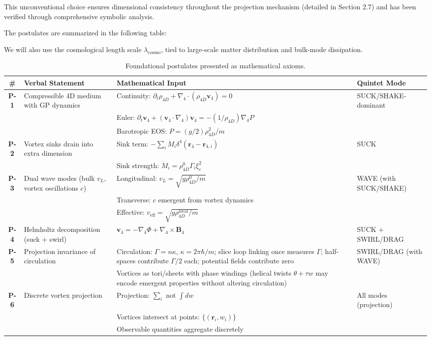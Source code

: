This unconventional choice ensures dimensional consistency throughout the projection mechanism (detailed in Section 2.7) and has been verified through comprehensive symbolic analysis.

\medskip

The postulates are summarized in the following table:

We will also use the cosmological length scale $\lambda_{\text{cosmo}}$, tied to large-scale matter distribution and bulk-mode dissipation.

\begin{table}[H]
\centering
\begin{tabularx}{\textwidth}{|c|Y|Y|Y|}
\hline
\# & Verbal Statement & Mathematical Input & Quintet Mode \\
\hline
\textbf{P-1} & Compressible 4D medium with GP dynamics & Continuity: $\partial_t \rho_{4D} + \nabla_4 \cdot (\rho_{4D} \mathbf{v}_4) = 0$ & SUCK/SHAKE-dominant \\
& & Euler: $\partial_t \mathbf{v}_4 + (\mathbf{v}_4 \cdot \nabla_4) \mathbf{v}_4 = -(1/\rho_{4D}) \nabla_4 P$ &  \\
& & Barotropic EOS: $P = (g/2) \rho_{4D}^2 / m$ &  \\
\hline
\textbf{P-2} & Vortex sinks drain into extra dimension & Sink term: $-\sum_i \dot{M}_i \delta^4(\mathbf{r}_4 - \mathbf{r}_{4,i})$ & SUCK \\
& & Sink strength: $\dot{M}_i = \rho_{4D}^0 \Gamma_i \xi_c^2$ &  \\
\hline
\textbf{P-3} & Dual wave modes (bulk $v_L$, vortex oscillations $c$) & Longitudinal: $v_L = \sqrt{g \rho_{4D}^0 / m}$ & WAVE (with SUCK/SHAKE) \\
& & Transverse: $c$ emergent from vortex dynamics &  \\
& & Effective: $v_{\text{eff}} = \sqrt{g \rho_{4D}^{\text{local}} / m}$ &  \\
\hline
\textbf{P-4} & Helmholtz decomposition (suck + swirl) & $\mathbf{v}_4 = -\nabla_4 \Phi + \nabla_4 \times \mathbf{B}_4$ & SUCK + SWIRL/DRAG \\
\hline
\textbf{P-5} & Projection invariance of circulation & Circulation: $\Gamma = n \kappa$, $\kappa = 2 \pi \hbar / m$; slice loop linking once measures $\Gamma$; half-spaces contribute $\Gamma/2$ each; potential fields contribute zero & SWIRL/DRAG (with WAVE) \\
& & Vortices as tori/sheets with phase windings (helical twists $\theta+\tau w$ may encode emergent properties without altering circulation) &  \\
\hline
\textbf{P-6} & Discrete vortex projection & Projection: $\sum_i$ not $\int dw$ & All modes (projection) \\
& & Vortices intersect at points: $\{(\mathbf{r}_i, w_i)\}$ &  \\
& & Observable quantities aggregate discretely &  \\
\hline
\end{tabularx}
\caption{Foundational postulates presented as mathematical axioms.}
\label{tab:postulates}
\end{table}

